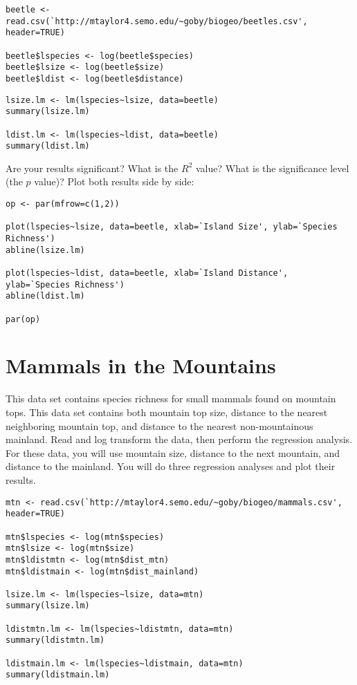 \documentclass[11pt, oneside]{article}   	%
\begin{document}
\begin{lstlisting}
beetle <- read.csv(`http://mtaylor4.semo.edu/~goby/biogeo/beetles.csv', header=TRUE)

beetle$lspecies <- log(beetle$species)
beetle$lsize <- log(beetle$size)
beetle$ldist <- log(beetle$distance)

\end{lstlisting}

\begin{lstlisting}
lsize.lm <- lm(lspecies~lsize, data=beetle)
summary(lsize.lm)

ldist.lm <- lm(lspecies~ldist, data=beetle)
summary(ldist.lm)

\end{lstlisting}

Are your results significant?  What is the $R^2$ value?  What is the significance level (the $p$ value)?  Plot both results side by side:

\begin{lstlisting}
op <- par(mfrow=c(1,2))

plot(lspecies~lsize, data=beetle, xlab=`Island Size', ylab=`Species Richness')
abline(lsize.lm)

plot(lspecies~ldist, data=beetle, xlab=`Island Distance', ylab=`Species Richness')
abline(ldist.lm)

par(op)
\end{lstlisting}

\section{Mammals in the Mountains}

This data set contains species richness for small mammals found on mountain tops. This data set contains both mountain top size, distance to the nearest neighboring mountain top, and distance to the nearest non-mountainous mainland.  Read and log transform the data, then perform the regression analysis.  For these data, you will use mountain size, distance to the next mountain, and distance to the mainland.  You will do three regression analyses and plot their results.


\begin{lstlisting}
mtn <- read.csv(`http://mtaylor4.semo.edu/~goby/biogeo/mammals.csv', header=TRUE)

mtn$lspecies <- log(mtn$species)
mtn$lsize <- log(mtn$size)
mtn$ldistmtn <- log(mtn$dist_mtn)
mtn$ldistmain <- log(mtn$dist_mainland)

lsize.lm <- lm(lspecies~lsize, data=mtn)
summary(lsize.lm)

ldistmtn.lm <- lm(lspecies~ldistmtn, data=mtn)
summary(ldistmtn.lm)

ldistmain.lm <- lm(lspecies~ldistmain, data=mtn)
summary(ldistmain.lm)

\end{lstlisting}
\end{document}
